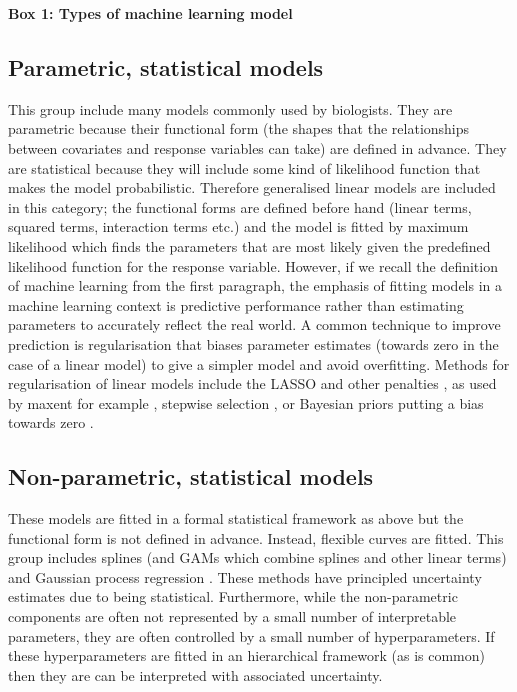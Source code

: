 \documentclass[10pt,]{article}
\begin{document}
\begin{figure*}[t]
\centering
\colorbox{boxcolour}{
\begin{minipage}{1\textwidth}


\setlength{\parindent}{3mm}
\noindent\textsf{\textbf{Box 1: Types of machine learning model}}\footnotesize

\vspace{-2mm}
\subsection{Parametric, statistical models}
This group include many models commonly used by biologists. They are parametric because their functional form (the shapes that the relationships between covariates and response variables can take) are defined in advance. They are statistical because they will include some kind of likelihood function that makes the model probabilistic. Therefore generalised linear models are included in this category; the functional forms are defined before hand (linear terms, squared terms, interaction terms etc.) and the model is fitted by maximum likelihood which finds the parameters that are most likely given the predefined likelihood function for the response variable. However, if we recall the definition of machine learning from the first paragraph, the emphasis of fitting models in a machine learning context is predictive performance rather than estimating parameters to accurately reflect the real world. A common technique to improve prediction is regularisation that biases parameter estimates (towards zero in the case of a linear model) to give a simpler model and avoid overfitting. Methods for regularisation of linear models include the LASSO and other penalties \citep{tibshirani1996regression, zou2005regularization, xu2017generalized, fan2001variable}, as used by maxent for example \citep{maxent}, stepwise selection \citep{hocking1976biometrics}, or Bayesian priors putting a bias towards zero \citep{park2008bayesian, liu2018bayesian, carvalho2009handling}.
\subsection{Non-parametric, statistical models}
These models are fitted in a formal statistical framework as above but the functional form is not defined in advance. Instead, flexible curves are fitted. This group includes splines (and GAMs which combine splines and other linear terms) and Gaussian process regression \citep{rasmussen2004gaussian}. These methods have principled uncertainty estimates due to being statistical. Furthermore, while the non-parametric components are often not represented by a small number of interpretable parameters, they are often controlled by a small number of hyperparameters. If these hyperparameters are fitted in an hierarchical framework (as is common) then they are can be interpreted with associated uncertainty.

\end{minipage}}
\end{figure*}
\end{document}
